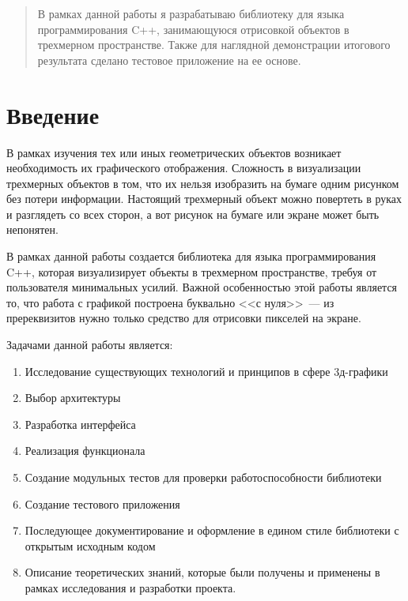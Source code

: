 \documentclass{article}
\begin{document}
\makeTitlePage

\tableofcontents

\begin{abstract}
В рамках данной работы я разрабатываю библиотеку для языка программирования C++, занимающуюся отрисовкой объектов в трехмерном пространстве. Также для наглядной демонстрации итогового результата сделано тестовое приложение на ее основе.
\end{abstract}

\newpage

\section{Введение}

В рамках изучения тех или иных геометрических объектов возникает необходимость их графического отображения. Сложность в визуализации трехмерных объектов в том, что их нельзя изобразить на бумаге одним рисунком без потери информации. Настоящий трехмерный объект можно повертеть в руках и разглядеть со всех сторон, а вот рисунок на бумаге или экране может быть непонятен.

В рамках данной работы создается библиотека для языка программирования C++, которая визуализирует объекты в трехмерном пространстве, требуя от пользователя минимальных усилий. Важной особенностью этой работы является то, что работа с графикой построена буквально <<с нуля>>~--- из пререквизитов нужно только средство для отрисовки пикселей на экране.

Задачами данной работы является:

\begin{enumerate}
\item Исследование существующих технологий и принципов в сфере 3д-графики
\item Выбор архитектуры
\item Разработка интерфейса
\item Реализация функционала
\item Создание модульных тестов для проверки работоспособности библиотеки
\item Создание тестового приложения
\item Последующее документирование и оформление в едином стиле библиотеки с открытым исходным кодом
\item Описание теоретических знаний, которые были получены и применены в рамках исследования и разработки проекта.
\end{enumerate}
\end{document}
